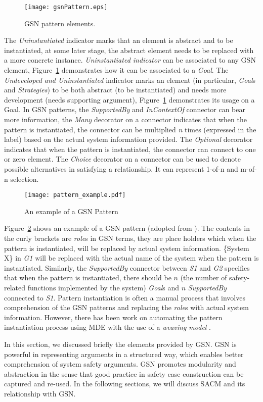 \begin{figure}
	\centering
	\texttt{[image: gsnPattern.eps]}
	\caption{GSN pattern elements.}
	\label{fig:gsnPatterns}
\end{figure}

The \textit{Uninstantiated} indicator marks that an element is abstract and to be instantiated, at some later stage, the abstract element needs to be replaced with a more concrete instance. 
\textit{Uninstantiated indicator} can be associated to any GSN element, Figure~\ref{fig:gsnPatterns} demonstrates how it can be associated to a \textit{Goal}. 
The \textit{Undeveloped and Uninstantiated} indicator marks an element (in particular, \textit{Goal}s and \textit{Strategies}) to be both abstract (to be instantiated) and needs more development (needs supporting argument), Figure~\ref{fig:gsnPatterns} demonstrates its usage on a Goal. 
In GSN patterns, the \textit{SupportedBy} and \textit{InContextOf} connector can bear more information, the \textit{Many} decorator on a connector indicates that when the pattern is instantiated, the connector can be multiplied \textit{n} times (expressed in the label) based on the actual system information provided. 
The \textit{Optional} decorator indicates that when the pattern is instantiated, the connector can connect to one or zero element. 
The \textit{Choice} decorator on a connector can be used to denote possible alternatives in satisfying a relationship. 
It can represent 1-of-n and m-of-n selection. 

\begin{figure}[ht!]
	\centering
	\texttt{[image: pattern\_example.pdf]}
	\caption{An example of a GSN Pattern \cite{kelly1997safety}}
	\label{fig:dmilsPattern}
\end{figure}

Figure~\ref{fig:dmilsPattern} shows an example of a GSN pattern (adopted from \cite{kelly1997safety}). 
The contents in the curly brackets are \textit{role}s in GSN terms, they are place holders which when the pattern is instantiated, will be replaced by actual system information.  
\{System X\} in \textit{G1} will be replaced with the actual name of the system when the pattern is instantiated.
Similarly, the \textit{SupportedBy} connector between \textit{S1} and \textit{G2} specifies that when the pattern is instantiated, there should be $n$ (the number of safety-related functions implemented by the system) \textit{Goal}s and $n$ \textit{SupportedBy} connected to \textit{S1}. 
Pattern instantiation is often a manual process that involves comprehension of the GSN patterns and replacing the \textit{role}s with actual system information. 
However, there has been work on automating the pattern instantiation process using MDE with the use of a \textit{weaving model} \cite{hawkins2015weaving}. 

In this section, we discussed briefly the elements provided by GSN. 
GSN is powerful in representing arguments in a structured way, which enables better comprehension of system safety arguments. 
GSN promotes modularity and abstraction in the sense that good practice in safety case construction can be captured and re-used. 
In the following sections, we will discuss SACM and its relationship with GSN. 